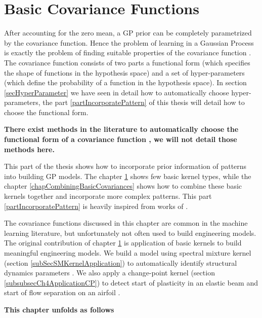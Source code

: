 \chapter{Basic Covariance Functions}
\label{chapBasicCovarianceKernels}

After accounting for the zero mean, a GP prior can be completely parametrized by the covariance function. Hence the problem of learning in a Gaussian Process is exactly the problem of finding suitable properties of the covariance function \cite{rasmussen2006gaussian}. The covariance function consists of two parts a functional form (which specifies the shape of functions in the hypothesis space) and a set of hyper-parameters (which define the probability of a function in the hypothesis space). In section \ref{secHyperParameter} we have seen in detail how to automatically choose hyper-parameters, the part \ref{partIncorporatePattern} of this thesis will detail how to choose the functional form. 

\textbf{There exist methods in the literature to automatically choose the functional form of a covariance function \cite{duvenaud-thesis-2014, lloyd2014automatic, automaticStatistician}, we will not detail those methods here.}


This part of the thesis shows how to incorporate prior information of patterns into building GP models. The chapter \ref{chapBasicCovarianceKernels} shows few basic kernel types, while the chapter \ref{chapCombiningBasicCovariances} shows how to combine these basic kernels together and incorporate more complex patterns. This part \ref{partIncorporatePattern} is heavily inspired from works of \cite{duvenaud-thesis-2014, wilson2014thesis, lloyd2014automatic, durrande2001etude}. 

The covariance functions discussed in this chapter are common in the machine learning literature, but unfortunately not often used to build engineering models. The original contribution of chapter \ref{chapBasicCovarianceKernels} is application of basic kernels to build meaningful engineering models. We build a model using spectral mixture kernel (section \ref{subSecSMKernelApplication}) to automatically identify structural dynamics parameters \cite{chiplunkar2017operational}. We also apply a change-point kernel (section \ref{subsubsecCh4ApplicationCP}) to detect start of plasticity in an elastic beam and start of flow separation on an airfoil \cite{chiplunkar:hal-01555401}.  

\textbf{This chapter unfolds as follows}

